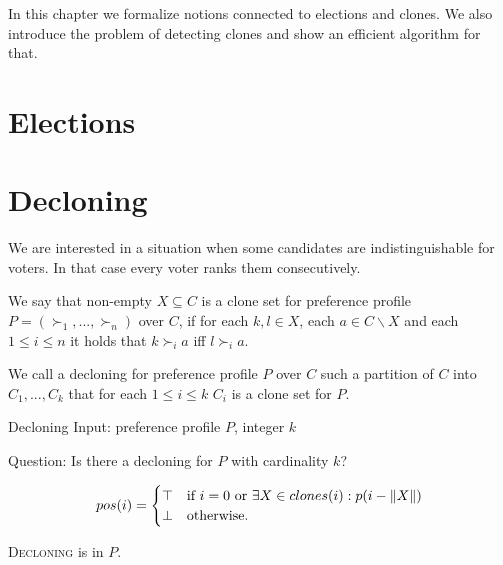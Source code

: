 In this chapter we formalize notions connected to elections and clones.
We also introduce the problem of detecting clones and show an efficient algorithm for that.

\section{Elections} 

\section{Decloning}

We are interested in a situation when some candidates are indistinguishable for voters.
In that case every voter ranks them consecutively.

\begin{defn}
We say that non-empty $X \subseteq C$ is a clone set for preference profile $P = (\succ_1, ... , \succ_n)$ over $C$,
if for each $k,l \in X$, each $a \in C \backslash X$ and each $1 \leq i \leq n $ it holds that
$k \succ_i a$ iff $l \succ_i a$.
\end{defn}

\begin{defn}[decloning]
We call a decloning for preference profile $P$ over $C$
such a partition of $C$  into $C_1, ... , C_k$
that for each $1 \leq i \leq k$ $C_i$ is a clone set for $P$.
\end{defn}


\begin{problem}{Decloning}
    Input: preference profile $P$, integer $k$

    Question: Is there a decloning for $P$ with cardinality $k$?
\end{problem}

$$
pos(i) =
    \begin{cases}
        \top & \text{if $i=0$ or } \exists X \in clones(i): p(i - \left\|X\right\|) \\
        \bot & \text{otherwise.}
    \end{cases}
$$

\begin{thm}
\textsc{Decloning} is in $P$.
\end{thm}